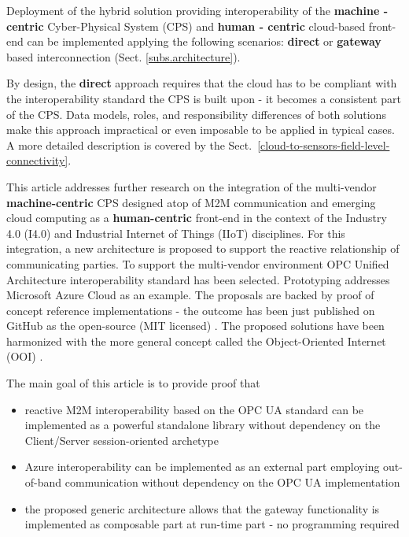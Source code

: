 \documentclass[runningheads]{llncs}
\begin{document}
Deployment of the hybrid solution providing interoperability of the \textbf{machine - centric} Cyber-Physical System (CPS) \cite{RefWorks:doc:5c458659e4b014f3944f6969} and \textbf{human - centric} cloud-based front-end can be implemented applying the following scenarios: \textbf{direct} or \textbf{gateway} based interconnection (Sect. \ref{subs.architecture}).

By design, the \textbf{direct} approach requires that the cloud has to be compliant with the interoperability standard the CPS is built upon - it becomes a consistent part of the CPS. Data models, roles, and responsibility differences of both solutions make this approach impractical or even imposable to be applied in typical cases. A more detailed description is covered by the Sect.~\ref{cloud-to-sensors-field-level-connectivity}.

This article addresses further research on the integration of the multi-vendor \textbf{machine-centric} CPS designed atop of M2M communication and emerging cloud computing as a \textbf{human-centric} front-end in the context of the Industry 4.0 (I4.0) and Industrial Internet of Things (IIoT) disciplines. For this integration, a new architecture is proposed to support the reactive relationship of communicating parties. To support the multi-vendor environment OPC Unified Architecture \cite{RefWorks:doc:5ac86c99e4b009947bbb87c6, LiteratureSurveyOnOpenPlatformCommunications, RefWorks:doc:5ac86c99e4b009947bbb87d2} interoperability standard has been selected. Prototyping addresses Microsoft Azure Cloud \cite{MicrosoftAzureIoTPlatform} as an example. The proposals are backed by proof of concept reference implementations - the outcome has been just published on GitHub as the open-source (MIT licensed) \cite{mariusz_postol_2020_4361640}. The proposed solutions have been harmonized with the more general concept called the Object-Oriented Internet (OOI) \cite{mariusz_postol_2020_4361640, RefWorks:doc:5c6912c9e4b0a562a3fc7f5b, RefWorks:doc:5c66740ae4b081adf5804596}.

The main goal of this article is to provide proof that

\begin{itemize}
      \item reactive M2M interoperability based on the OPC UA standard can be implemented as a powerful standalone library without dependency on the Client/Server session-oriented archetype
      \item Azure interoperability can be implemented as an external part employing out-of-band communication without dependency on the OPC UA implementation
      \item the proposed generic architecture allows that the gateway functionality is implemented as composable part at run-time part - no programming required
\end{itemize}
\end{document}
